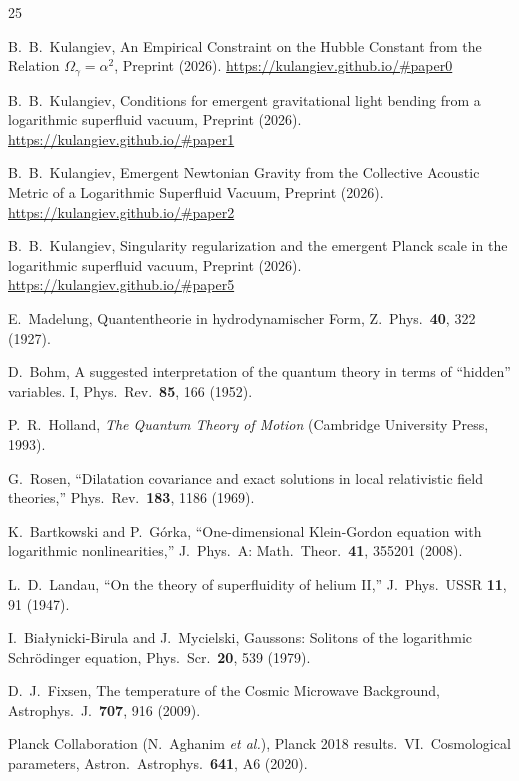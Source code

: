 \documentclass[12pt, a4paper]{article}
\begin{document}
\newpage
\begin{thebibliography}{25}

B.~B.~Kulangiev,
An Empirical Constraint on the Hubble Constant from the Relation $\Omega_\gamma = \alpha^2$,
Preprint (2026).
\url{https://kulangiev.github.io/#paper0}

B.~B.~Kulangiev,
Conditions for emergent gravitational light bending from a logarithmic superfluid vacuum,
Preprint (2026). \url{https://kulangiev.github.io/#paper1}

B.~B.~Kulangiev,
Emergent Newtonian Gravity from the Collective Acoustic Metric of a Logarithmic Superfluid Vacuum,
Preprint (2026).
\url{https://kulangiev.github.io/#paper2}

B.~B.~Kulangiev,
Singularity regularization and the emergent Planck scale in the logarithmic superfluid vacuum,
Preprint (2026). \url{https://kulangiev.github.io/#paper5}

E.~Madelung,
Quantentheorie in hydrodynamischer Form,
Z.\ Phys.\ \textbf{40}, 322 (1927).

D.~Bohm,
A suggested interpretation of the quantum theory in terms of ``hidden'' variables. I,
Phys.\ Rev.\ \textbf{85}, 166 (1952).

P.~R.~Holland,
\emph{The Quantum Theory of Motion} (Cambridge University Press, 1993).

G.~Rosen,
``Dilatation covariance and exact solutions in local relativistic field theories,''
Phys.\ Rev.\ \textbf{183}, 1186 (1969).

K.~Bartkowski and P.~G\'{o}rka,
``One-dimensional Klein-Gordon equation with logarithmic nonlinearities,''
J.\ Phys.\ A: Math.\ Theor.\ \textbf{41}, 355201 (2008).

L.~D.~Landau,
``On the theory of superfluidity of helium II,''
J.\ Phys.\ USSR \textbf{11}, 91 (1947).

I.~Bia\l{}ynicki-Birula and J.~Mycielski,
Gaussons: Solitons of the logarithmic Schr\"{o}dinger equation,
Phys.\ Scr.\ \textbf{20}, 539 (1979).

D.~J.~Fixsen,
The temperature of the Cosmic Microwave Background,
Astrophys.\ J.\ \textbf{707}, 916 (2009).

Planck Collaboration (N.~Aghanim \emph{et al.}),
Planck 2018 results.\ VI.\ Cosmological parameters,
Astron.\ Astrophys.\ \textbf{641}, A6 (2020).


\end{thebibliography}
\end{document}
